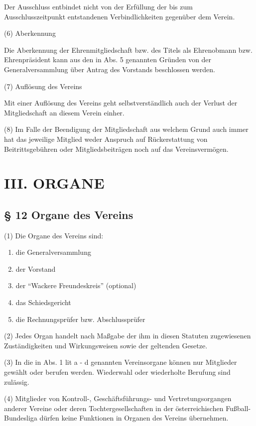 \documentclass[11pt,a4paper]{article}
\begin{document}
Der Ausschluss entbindet nicht von der Erfüllung der bis zum Ausschlusszeitpunkt entstandenen Verbindlichkeiten gegenüber dem Verein.

(6)
Aberkennung

Die Aberkennung der Ehrenmitgliedschaft bzw. des Titels als Ehrenobmann bzw. Ehrenpräsident kann aus den in Abs. 5 genannten Gründen von der Generalversammlung über Antrag des Vorstands beschlossen werden.

(7)
Auflösung des Vereins

Mit einer Auflösung des Vereins geht selbstverständlich auch der Verlust der Mitgliedschaft an diesem Verein einher.

(8)
Im Falle der Beendigung der Mitgliedschaft aus welchem Grund auch immer hat das jeweilige Mitglied weder Anspruch auf Rückerstattung von Beitrittsgebühren oder Mitgliedsbeiträgen noch auf das Vereinsvermögen.

\section{III. ORGANE}

\subsection{§ 12
Organe des Vereins}

(1)
Die Organe des Vereins sind:

\begin{enumerate}[label=\alph*)]
\item
die Generalversammlung
\item
der Vorstand
\item
der "`Wackere Freundeskreis"' (optional)
\item
das Schiedsgericht
\item
die Rechnungsprüfer bzw. Abschlussprüfer
\end{enumerate}

(2)
Jedes Organ handelt nach Maßgabe der ihm in diesen Statuten zugewiesenen Zuständigkeiten und Wirkungsweisen sowie der geltenden Gesetze.

(3)
In die in Abs. 1 lit a - d genannten Vereinsorgane können nur Mitglieder gewählt oder berufen werden.
Wiederwahl oder wiederholte Berufung sind zulässig.

(4)
Mitglieder von Kontroll-, Geschäftsführungs- und Vertretungsorgangen anderer Vereine oder deren Tochtergesellschaften in der österreichischen Fußball- Bundesliga dürfen keine Funktionen in Organen des Vereins übernehmen.
\end{document}
